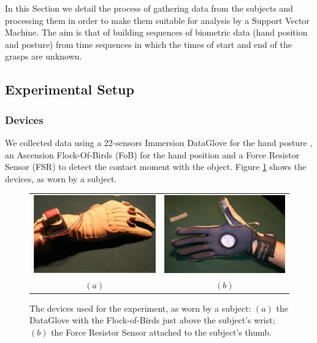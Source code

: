 In this Section we detail the process of gathering data from the
subjects and processing them in order to make them suitable for
analysis by a Support Vector Machine. The aim is that of building
sequences of biometric data (hand position and posture) from time
sequences in which the times of start and end of the grasps are
unknown.

\subsection{Experimental Setup}

\subsubsection*{Devices}

We collected data using a 22-sensors Immersion DataGlove for the hand
posture \cite{dataglove}, an Ascension Flock-Of-Birds (FoB) for the hand
position \cite{fob} and a Force Resistor Sensor (FSR) to detect the
contact moment with the object. Figure \ref{fig:devices} shows the
devices, as worn by a subject.

\begin{figure}[htbp]
  \begin{center}
    \begin{tabular}{cc}
      \includegraphics[width=0.45\linewidth]{devices1.eps} &
      \includegraphics[width=0.45\linewidth]{devices2.eps} \\
      $(a)$ & $(b)$
    \end{tabular}
    \caption{The devices used for the experiment, as worn by a
    subject: $(a)$ the DataGlove with the Flock-of-Birds just above the
    subject's wrist; $(b)$ the Force Resistor Sensor attached to the
    subject's thumb.}
    \label{fig:devices}
  \end{center}
\end{figure}


